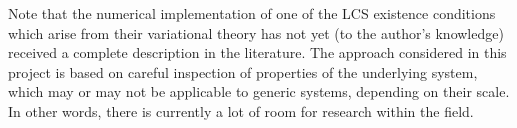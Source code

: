 Note that the numerical implementation of one of the LCS existence conditions
which arise from their variational theory has not yet (to the author's
knowledge) received a complete description in the literature.
The approach considered in this project is based on careful inspection
of properties of the underlying system, which may or may not be applicable to
generic systems, depending on their scale. In other words, there is currently a
lot of room for research within the field.
